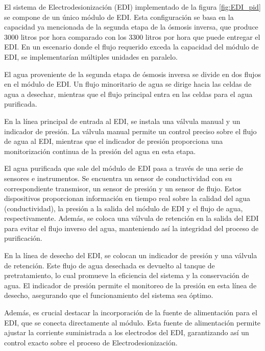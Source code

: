El sistema de Electrodesionización (EDI) implementado de la figura \ref{fig:EDI_pid} se compone de un único módulo de EDI.
Esta configuración se basa en la capacidad ya mencionada de la segunda etapa de la ósmosis inversa, que
produce 3000 litros por hora comparado con los 3300 litros por hora que puede entregar el EDI.
En un escenario donde el flujo requerido exceda la
capacidad del módulo de EDI, se implementarían múltiples unidades en paralelo.

El agua proveniente de la segunda etapa de ósmosis inversa se divide en dos flujos en el módulo de
EDI. Un flujo minoritario de agua se dirige hacia las celdas de agua a desechar, mientras que el flujo principal entra en las celdas para el agua purificada.


En la línea principal de entrada al EDI, se instala una válvula manual y un indicador de presión. La válvula manual permite un control preciso sobre el flujo de agua al EDI, mientras que el indicador de presión proporciona una monitorización continua de la presión del agua en esta etapa.

El agua purificada que sale del módulo de EDI pasa a través de una serie de sensores e instrumentos. Se encuentra un sensor de conductividad con su correspondiente transmisor, un sensor de presión y un sensor de flujo. Estos dispositivos proporcionan información en tiempo real sobre la calidad del agua (conductividad), la presión a la salida del módulo de EDI y el flujo de agua, respectivamente. Además, se coloca una válvula de retención en la salida del EDI para evitar el flujo inverso del agua, manteniendo así la integridad del proceso de purificación.

En la línea de desecho del EDI, se colocan un indicador de presión y una válvula de retención. Este flujo de agua desechada es devuelto al tanque de pretratamiento, lo cual promueve la eficiencia del sistema y la conservación de agua. El indicador de presión permite el monitoreo de la presión en esta línea de desecho, asegurando que el funcionamiento del sistema sea óptimo.

Además, es crucial destacar la incorporación de la fuente de alimentación para el EDI, que se conecta directamente al módulo. Esta fuente de alimentación permite ajustar la corriente suministrada a los electrodos del EDI, garantizando así un control exacto sobre el proceso de Electrodesionización.
